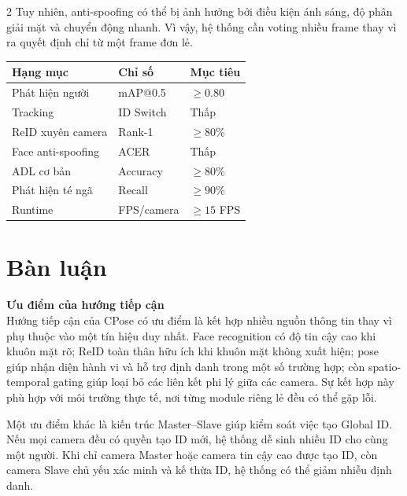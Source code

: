 \documentclass[a4paper, twoside, 12pt]{article}
\begin{document}
\begin{multicols}{2}
Tuy nhiên, anti-spoofing có thể bị ảnh hưởng bởi điều kiện ánh sáng, độ phân giải mặt và chuyển động nhanh. Vì vậy, hệ thống cần voting nhiều frame thay vì ra quyết định chỉ từ một frame đơn lẻ.

\vspace{0.2cm}
\begin{center}
\label{tab:expected_results}
\renewcommand{\arraystretch}{1.2}
\scriptsize
\begin{tabular}{|p{3.0cm}|p{2.5cm}|p{2.0cm}|}
\hline
\textbf{Hạng mục} & \textbf{Chỉ số} & \textbf{Mục tiêu} \\
\hline
Phát hiện người & mAP@0.5 & $\geq 0.80$ \\
\hline
Tracking & ID Switch & Thấp \\
\hline
ReID xuyên camera & Rank-1 & $\geq 80\%$ \\
\hline
Face anti-spoofing & ACER & Thấp \\
\hline
ADL cơ bản & Accuracy & $\geq 80\%$ \\
\hline
Phát hiện té ngã & Recall & $\geq 90\%$ \\
\hline
Runtime & FPS/camera & $\geq 15$ FPS \\
\hline
\end{tabular}
\end{center}

\vspace{0.2cm}

\section{Bàn luận}
\vspace{-0.6cm}

\hspace*{0.5cm}\textbf{Ưu điểm của hướng tiếp cận}\\
Hướng tiếp cận của CPose có ưu điểm là kết hợp nhiều nguồn thông tin thay vì phụ thuộc vào một tín hiệu duy nhất. Face recognition có độ tin cậy cao khi khuôn mặt rõ; ReID toàn thân hữu ích khi khuôn mặt không xuất hiện; pose giúp nhận diện hành vi và hỗ trợ định danh trong một số trường hợp; còn spatio-temporal gating giúp loại bỏ các liên kết phi lý giữa các camera. Sự kết hợp này phù hợp với môi trường thực tế, nơi từng module riêng lẻ đều có thể gặp lỗi.

Một ưu điểm khác là kiến trúc Master--Slave giúp kiểm soát việc tạo Global ID. Nếu mọi camera đều có quyền tạo ID mới, hệ thống dễ sinh nhiều ID cho cùng một người. Khi chỉ camera Master hoặc camera tin cậy cao được tạo ID, còn camera Slave chủ yếu xác minh và kế thừa ID, hệ thống có thể giảm nhiễu định danh.


\end{multicols}
\end{document}
